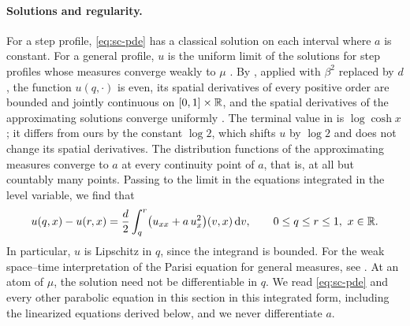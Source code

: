 \paragraph{Solutions and regularity.}
For a step profile, \eqref{eq:sc-pde} has a classical solution on each
interval where $a$ is constant. For a general profile, $u$ is the
uniform limit of the solutions for step profiles whose measures
converge weakly to $\mu$ \cite[Section~2.1]{Lopatto}. By
\cite[Proposition~2.1]{Lopatto}, applied with $\beta^2$ replaced by $d$,
the function $u(q,\cdot)$ is even, its spatial derivatives of every
positive order are bounded and jointly continuous on $[0,1]\times\mathbb R$,
and the spatial derivatives of the approximating solutions converge
uniformly \cite[(2.2)]{Lopatto}. The terminal value in \cite{Lopatto}
is $\log\cosh x$; it differs from ours by the constant $\log2$, which
shifts $u$ by $\log2$ and does not change its spatial derivatives. The
distribution functions of the approximating measures converge to $a$
at every continuity point of $a$, that is, at all but countably many
points. Passing to the limit in the equations integrated in the level
variable, we find that
\begin{equation}\label{eq:sc-pde-integrated}
 u(q,x)-u(r,x)=\frac d2\int_q^r\bigl(u_{xx}+a\,u_x^2\bigr)(v,x)\,\mathrm d v,
 \qquad 0\le q\le r\le1,\ x\in\mathbb R .
\end{equation}
In particular, $u$ is Lipschitz in $q$, since the integrand is bounded.
For the weak space--time interpretation of the Parisi equation for
general measures, see \cite[Theorem~4]{JagannathTobasco2016}.
At an atom of $\mu$, the solution need not be differentiable in $q$. We
read \eqref{eq:sc-pde} and every other parabolic equation in this
section in this integrated form, including the linearized equations
derived below, and we never differentiate $a$.

